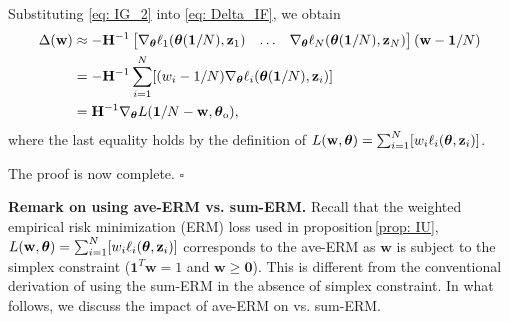 Substituting \eqref{eq: IG_2} into  \eqref{eq: Delta_IF}, we obtain 
\begin{align}
\Delta(\mathbf w) & \approx 
- \mathbf H^{-1}  \begin{bmatrix}
    \nabla_{\boldsymbol{\theta}} \ell_1(\boldsymbol{\theta}(\mathbf 1/N), \mathbf z_1) & \ldots &
    \nabla_{\boldsymbol{\theta}} \ell_N(\boldsymbol{\theta}(\mathbf 1/N), \mathbf z_N)
    \end{bmatrix} (\mathbf w - \mathbf 1/N) \nonumber \\
    & = 
-\mathbf H^{-1} \sum_{i = 1}^{N} [ (w_i - 1 / N)\nabla_{\boldsymbol{\theta}} \ell_i(\boldsymbol{\theta}(\mathbf 1 / N), \mathbf z_i) ] \nonumber\\
& = \mathbf H^{-1} \nabla_{\boldsymbol{\theta}} L(\mathbf 1 / N - \mathbf w, \boldsymbol \theta_\mathrm{o}),
\end{align}
where the last equality holds by the definition of   $L(\mathbf w, \boldsymbol{\theta}) = \sum_{i=1}^N [w_i \ell_i (\boldsymbol{\theta}, \mathbf z_i)]$.

The proof is now complete.  \hfill $\square$


\textbf{Remark on {\IU} using ave-ERM vs. sum-ERM.}
Recall that the weighted empirical risk minimization (ERM) loss used in proposition\,\eqref{prop: IU}, $L(\mathbf w,\boldsymbol{\theta}) =  \sum_{i=1}^N [w_i \ell_i (\boldsymbol{\theta}, \mathbf z_i)]$   corresponds to the ave-ERM as $\mathbf w$ is subject to the simplex constraint ($\mathbf 1^T \mathbf w = 1$ and $\mathbf w \geq \mathbf 0$). This is different from the conventional derivation of {\IU} using  the sum-ERM \cite{koh2017understanding,guo2019certified} in the absence of simplex  constraint. In what follows, we discuss the impact of   ave-ERM on {\IU} vs. 
sum-ERM.


